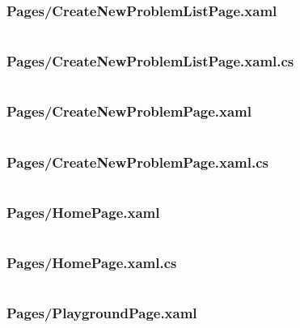 \documentclass[a4paper]{report}
\begin{document}
\inputminted{csharp}{"../src/Algorithm Dynamics/Pages/CodingPage.xaml.cs"}

\subsubsection{Pages/CreateNewProblemListPage.xaml}

\inputminted{xml}{"../src/Algorithm Dynamics/Pages/CreateNewProblemListPage.xaml"}

\subsubsection{Pages/CreateNewProblemListPage.xaml.cs}
\label{subsubsec:createnewproblemlistpage
}

\inputminted{csharp}{"../src/Algorithm Dynamics/Pages/CreateNewProblemListPage.xaml.cs"}

\subsubsection{Pages/CreateNewProblemPage.xaml}

\inputminted{xml}{"../src/Algorithm Dynamics/Pages/CreateNewProblemPage.xaml"}

\subsubsection{Pages/CreateNewProblemPage.xaml.cs}

\inputminted{csharp}{"../src/Algorithm Dynamics/Pages/CreateNewProblemPage.xaml.cs"}

\subsubsection{Pages/HomePage.xaml}

\inputminted{xml}{"../src/Algorithm Dynamics/Pages/HomePage.xaml"}

\subsubsection{Pages/HomePage.xaml.cs}

\inputminted{csharp}{"../src/Algorithm Dynamics/Pages/HomePage.xaml.cs"}

\subsubsection{Pages/PlaygroundPage.xaml}
\end{document}
